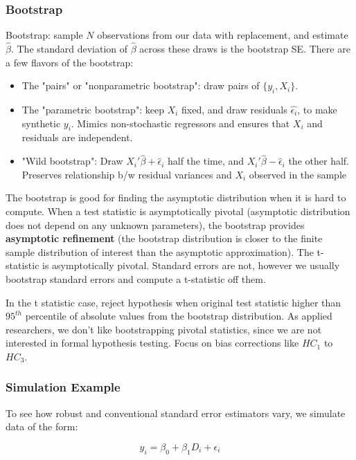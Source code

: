 \documentclass[12 pt, leqno]{article}
\begin{document}
\subsubsection*{Bootstrap}
 
Bootstrap: sample $N$ observations from our data with replacement, and estimate $\hat{\beta}$. The standard deviation of $\hat{\beta}$ across these draws is the bootstrap SE. There are a few flavors of the bootstrap:

\begin{itemize}
\item The "pairs" or "nonparametric bootstrap": draw pairs of $\{y_i, X_i \}$.
\item The "parametric bootstrap": keep $X_i$ fixed, and draw residuals $\hat{\epsilon_i}$, to make synthetic $y_i$. Mimics non-stochastic regressors and ensures that $X_i$ and residuals are independent. 
\item "Wild bootstrap": Draw $X_i' \hat{\beta} + \hat{\epsilon}_i$ half the time, and $X_i' \hat{\beta} - \hat{\epsilon}_i$ the other half. Preserves relationship b/w residual variances and $X_i$ observed in the sample
\end{itemize}

The bootstrap is good for finding the asymptotic distribution when it is hard to compute. When a test statistic is asymptotically pivotal (asymptotic distribution does not depend on any unknown parameters), the bootstrap provides \textbf{asymptotic refinement} (the bootstrap distribution is closer to the finite sample distribution of interest than the asymptotic approximation). The t-statistic is asymptotically pivotal. Standard errors are not, however we usually bootstrap standard errors and compute a t-statistic off them.

In the t statistic case, reject hypothesis when original test statistic higher than $95^{th}$ percentile of absolute values from the bootstrap distribution. As applied researchers, we don't like bootstrapping pivotal statistics, since we are not interested in formal hypothesis testing. Focus on bias corrections like $HC_1$ to $HC_3$. 

\subsubsection*{Simulation Example}

To see how robust and conventional standard error estimators vary, we simulate data of the form:

$$y_i = \beta_0 + \beta_1 D_i + \epsilon_i$$
\end{document}
